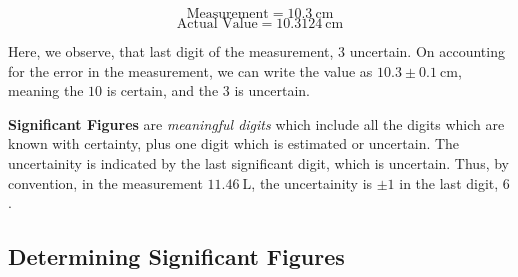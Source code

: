 \documentclass[
  14pt,
]{extarticle}
\begin{document}
\[\text{Measurement}={10.3~\mathrm{cm}}\]
\[\text{Actual Value}={10.3124~\mathrm{cm}}\]

Here, we observe, that last digit of the measurement, \(3\) uncertain.
On accounting for the error in the measurement, we can write the value
as \({10.3 {}\pm{} 0.1~\mathrm{cm}}\), meaning the \({10}\) is certain,
and the \({3}\) is uncertain.

\textbf{Significant Figures} are \emph{meaningful digits} which include
all the digits which are known with certainty, plus one digit which is
estimated or uncertain. The uncertainity is indicated by the last
significant digit, which is uncertain. Thus, by convention, in the
measurement \({11.46~\mathrm{L}}\), the uncertainity is \(\pm1\) in the
last digit, \(6\).

\hypertarget{determining-significant-figures}{%
\subsection{Determining Significant
Figures}\label{determining-significant-figures}}
\end{document}
